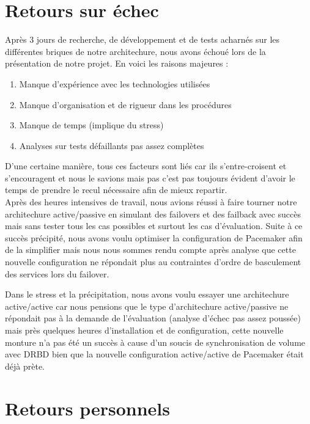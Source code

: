 \documentclass[11pt,a4paper]{report}
\begin{document}
        \section{Retours sur échec}
        
            Après 3 jours de recherche, de développement et de tests acharnés sur les différentes briques de notre architechure, nous avons échoué lors de la présentation de notre projet. En voici les raisons majeures :\\
            
            \begin{enumerate}
                \item Manque d'expérience avec les technologies utilisées
                \item Manque d'organisation et de rigueur dans les procédures
                \item Manque de temps (implique du stress)
                \item Analyses sur tests défaillants pas assez complètes
            \end{enumerate}
            
            D'une certaine manière, tous ces facteurs sont liés car ils s'entre-croisent et s'encouragent et nous le savions mais pas c'est pas toujours évident d'avoir le temps de prendre le recul nécessaire afin de mieux repartir.\\
            
            Après des heures intensives de travail, nous avions réussi à faire tourner notre architechure active/passive en simulant des failovers et des failback avec succès mais sans tester tous les cas possibles et surtout les cas d'évaluation. Suite à ce succès précipité, nous avons voulu optimiser la configuration de Pacemaker afin de la simplifier mais nous nous sommes rendu compte après analyse que cette nouvelle configuration ne répondait plus au contraintes d'ordre de basculement des services lors du failover.
            
            Dans le stress et la précipitation, nous avons voulu essayer une architechure active/active car nous pensions que le type d'architechure active/passive ne répondait pas à la demande de l'évaluation (analyse d'échec pas assez poussée) mais près quelques heures d'installation et de configuration, cette nouvelle monture n'a pas été un succès à cause d'un soucis de synchronisation de volume avec DRBD bien que la nouvelle configuration active/active de Pacemaker était déjà prète.
        
        \section{Retours personnels}
\end{document}
